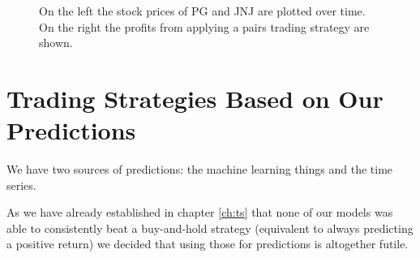 \begin{figure}[h!]
    \centering
    \begin{adjustbox}{width=.95\textwidth,center}
        
        
    \end{adjustbox}  
    \caption{On the left the stock prices of PG and JNJ are plotted over time. On the right the profits from applying a pairs trading strategy are shown.}
    \label{fig:coint_PG_JNJ}
\end{figure}{}

\section{Trading Strategies Based on Our Predictions}
We have two sources of predictions: the machine learning things and the time series. 

As we have already established in chapter \ref{ch:ts} that none of our models was able to consistently beat a buy-and-hold strategy (equivalent to always predicting a positive return) we decided that using those for predictions is altogether futile. 




